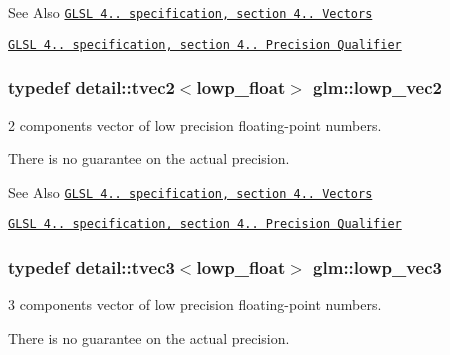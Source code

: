 \begin{DoxySeeAlso}{See Also}
\href{http://www.opengl.org/registry/doc/GLSLangSpec.4.20.8.pdf}{\tt G\-L\-S\-L 4.. specification, section 4.. Vectors} 

\href{http://www.opengl.org/registry/doc/GLSLangSpec.4.20.8.pdf}{\tt G\-L\-S\-L 4.. specification, section 4.. Precision Qualifier} 
\end{DoxySeeAlso}
\hypertarget{group__core__precision_ga158d9bb292b42c86b36e8eaff3b22394}{
\subsubsection[{lowp\-\_\-vec2}]{\setlength{\rightskip}{0pt plus 5cm}typedef detail\-::tvec2$<$lowp\-\_\-float$>$ {\bf glm\-::lowp\-\_\-vec2}}}\label{group__core__precision_ga158d9bb292b42c86b36e8eaff3b22394}


2 components vector of low precision floating-\/point numbers. 

There is no guarantee on the actual precision.

\begin{DoxySeeAlso}{See Also}
\href{http://www.opengl.org/registry/doc/GLSLangSpec.4.20.8.pdf}{\tt G\-L\-S\-L 4.. specification, section 4.. Vectors} 

\href{http://www.opengl.org/registry/doc/GLSLangSpec.4.20.8.pdf}{\tt G\-L\-S\-L 4.. specification, section 4.. Precision Qualifier} 
\end{DoxySeeAlso}
\hypertarget{group__core__precision_gaacc50c233ef2759c852eb90be78bc5fc}{
\subsubsection[{lowp\-\_\-vec3}]{\setlength{\rightskip}{0pt plus 5cm}typedef detail\-::tvec3$<$lowp\-\_\-float$>$ {\bf glm\-::lowp\-\_\-vec3}}}\label{group__core__precision_gaacc50c233ef2759c852eb90be78bc5fc}


3 components vector of low precision floating-\/point numbers. 

There is no guarantee on the actual precision.

